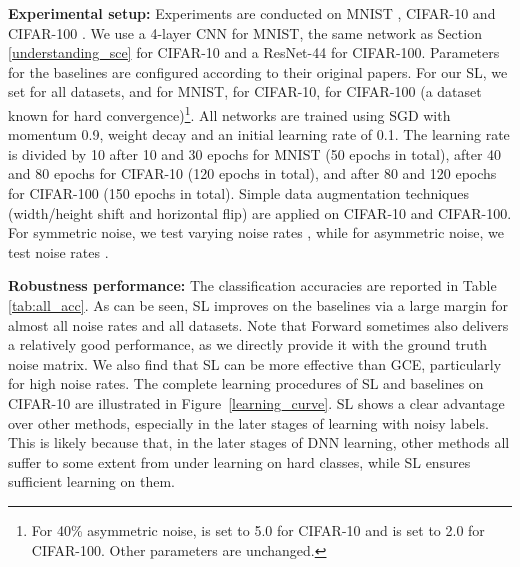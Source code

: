 \documentclass[10pt,twocolumn,letterpaper]{article}
\begin{document}
\noindent\textbf{Experimental setup:} 
Experiments are conducted on MNIST \cite{lecun1998gradient}, CIFAR-10 \cite{krizhevsky2009learning} and CIFAR-100 \cite{krizhevsky2009learning}. We use a 4-layer CNN for MNIST, the same network as Section \ref{understanding_sce} for CIFAR-10 and a ResNet-44 \cite{he2016deep} for CIFAR-100. Parameters for the baselines are configured according to their original papers. For our SL, we set  for all datasets, and  for MNIST,  for CIFAR-10,  for CIFAR-100 (a dataset known for hard convergence)\footnote{For 40\% asymmetric noise,  is set to 5.0 for CIFAR-10 and  is set to 2.0 for CIFAR-100. Other parameters are unchanged.}. All networks are trained using SGD with momentum 0.9, weight decay  and an initial learning rate of 0.1. The learning rate is divided by 10 after 10 and 30 epochs for MNIST (50 epochs in total), after 40 and 80 epochs for CIFAR-10 (120 epochs in total), and after 80 and 120 epochs for CIFAR-100 (150 epochs in total). Simple data augmentation techniques (width/height shift and horizontal flip) are applied on CIFAR-10 and CIFAR-100. For symmetric noise, we test varying noise rates , while for asymmetric noise, we test noise rates . 

\noindent\textbf{Robustness performance:} The classification accuracies are reported in Table \ref{tab:all_acc}. As can be seen, SL improves on the baselines via a large margin for almost all noise rates and all datasets. Note that Forward sometimes also delivers a relatively good performance, as we directly provide it with the ground truth noise matrix. We also find that SL can be more effective than GCE, particularly for high noise rates. The complete learning procedures of SL and baselines on CIFAR-10 are illustrated in Figure~\ref{learning_curve}. SL shows a clear advantage over other methods, especially in the later stages of learning with noisy labels. This is likely because that, in the later stages of DNN learning, other methods all suffer to some extent from under learning on hard classes, while SL ensures sufficient learning on them. 
\end{document}

